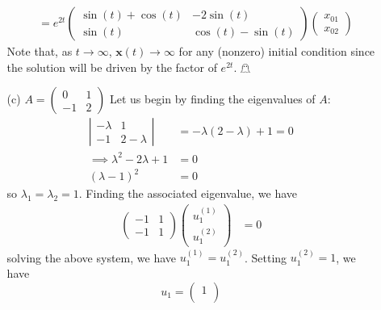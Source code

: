 \documentclass{article}
\begin{document}
\begin{itemize}
\begin{itemize}
\begin{align*}
            &= e^{2t}\begin{pmatrix}
                \sin(t) + \cos(t) & -2\sin(t)\\
                \sin(t) & \cos(t) - \sin(t)
            \end{pmatrix}\begin{pmatrix}
                x_{01}\\
                x_{02}
            \end{pmatrix}
        \end{align*}
        Note that, as $t \to \infty$, $\mathbf{x}(t) \to \infty$ for any (nonzero) initial condition since the solution will be driven by the factor of $e^{2t}$. \hfill $\mathghost$
        

        \item[(c)] $A = \begin{pmatrix}
            0 & 1\\
            -1 & 2
        \end{pmatrix}$
        \newline\newline
        Let us begin by finding the eigenvalues of $A$:
        \begin{align*}
            \left|\begin{matrix}
                -\lambda & 1\\
                -1 & 2 - \lambda
            \end{matrix}\right| &= -\lambda(2 - \lambda) + 1 = 0\\
            \implies \lambda^2 - 2\lambda + 1 &= 0\\
            (\lambda - 1)^2 &= 0
        \end{align*}
        so $\lambda_1 = \lambda_2 = 1$. Finding the associated eigenvalue, we have
        \begin{align*}
            \begin{pmatrix}
                -1 & 1\\
                -1 & 1
            \end{pmatrix}\begin{pmatrix}
                u_1^{(1)}\\
                u_1^{(2)}
            \end{pmatrix} &= 0
        \end{align*}
        solving the above system, we have $u_1^{(1)} = u_1^{(2)}$. Setting $u_1^{(2)} = 1$, we have
        \[u_1 = \begin{pmatrix}
            1\\

\end{pmatrix}\]
\end{itemize}
\end{itemize}
\end{document}
